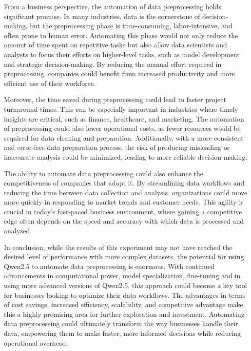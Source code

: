 From a business perspective, the automation of data preprocessing holds significant promise. In many industries, data is the cornerstone of decision-making, but the preprocessing phase is time-consuming, labor-intensive, and often prone to human error. Automating this phase would not only reduce the amount of time spent on repetitive tasks but also allow data scientists and analysts to focus their efforts on higher-level tasks, such as model development and strategic decision-making. By reducing the manual effort required in preprocessing, companies could benefit from increased productivity and more efficient use of their workforce.

Moreover, the time saved during preprocessing could lead to faster project turnaround times. This can be especially important in industries where timely insights are critical, such as finance, healthcare, and marketing. The automation of preprocessing could also lower operational costs, as fewer resources would be required for data cleaning and preparation. Additionally, with a more consistent and error-free data preparation process, the risk of producing misleading or inaccurate analysis could be minimized, leading to more reliable decision-making.

The ability to automate data preprocessing could also enhance the competitiveness of companies that adopt it. By streamlining data workflows and reducing the time between data collection and analysis, organizations could move more quickly in responding to market trends and customer needs. This agility is crucial in today's fast-paced business environment, where gaining a competitive edge often depends on the speed and accuracy with which data is processed and analyzed.

In conclusion, while the results of this experiment may not have reached the desired level of performance with more complex datasets, the potential for using Qwen2.5 to automate data preprocessing is enormous. With continued advancements in computational power, model specialization, fine-tuning and in using more advanced versions of Qwen2.5, this approach could become a key tool for businesses looking to optimize their data workflows. The advantages in terms of cost savings, increased efficiency, scalability, and competitive advantage make this a highly promising area for further exploration and investment. Automating data preprocessing could ultimately transform the way businesses handle their data, empowering them to make faster, more informed decisions while reducing operational overhead.

